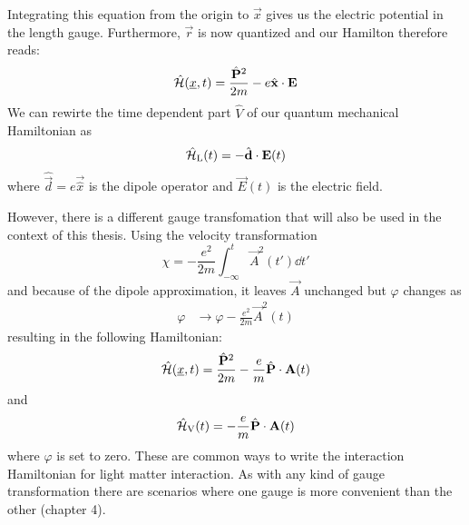 Integrating this equation from the origin to $\vec{x}$ gives us the electric potential in the length gauge. Furthermore, $\vec{r}$ is now quantized and our Hamilton therefore reads:
\begin{equation*}
    \hat{\Hs}(\uvec{x}, t) = \frac{\hat{\vec{P}}^2}{2m} - e \hat{\vec{x}} \cdot \vec{E} %
\end{equation*}
We can rewirte the time dependent part $\hat{V}$ of our quantum mechanical Hamiltonian as
\begin{equation}
    \hat{\mathcal{H}}_{\mathrm{L}}(t) = -\hat{\mathbf{d}} \cdot \mathbf{E}(t) \label{eq:dipoleApprox}
\end{equation}
where $\hat{\vec{d}}=e\vec{\hat{x}}$ is the dipole operator and $\vec{E}(t)$ is the electric field.

However, there is a different gauge transfomation that will also be used in the context of this thesis.
Using the velocity transformation
\begin{equation*}
    \chi = -\frac{e^2}{2m}\int_{-\infty}^{t} \vec{A}^2(t') \dd t'
\end{equation*}
and because of the dipole approximation, it leaves $\vec{A}$ unchanged but $\varphi$ changes as 
\begin{align*}
    \varphi &\to \varphi -\frac{e^2}{2m}\vec{A}^2(t) 
\end{align*}
resulting in the following Hamiltonian:
\begin{equation*}
    \hat{\mathcal{H}}(\underline{x}, t) = \frac{\hat{\mathbf{P}}^2}{2m} -\frac{e}{m}\hat{\mathbf{P}} \cdot \mathbf{A}(t)
\end{equation*}
and
\begin{equation}
    \hat{\mathcal{H}}_{\mathrm{V}}(t) = -\frac{e}{m}\hat{\mathbf{P}} \cdot \mathbf{A}(t) \label{eq:dipoleApprox_velocity}
\end{equation}
where $\varphi$ is set to zero.
These are common ways to write the interaction Hamiltonian for light matter interaction.
As with any kind of gauge transformation there are scenarios where one gauge is more convenient than the other (chapter 4).










\newpage
